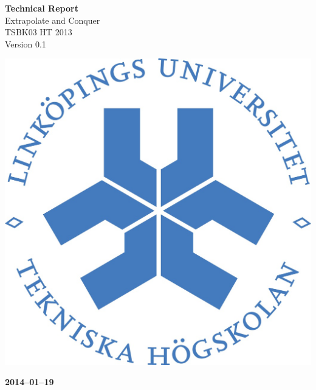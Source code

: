 \documentclass[pdftex, fontsize=11pt, a4paper]{scrbook}
\begin{document}
\begin{titlepage}
\thispagestyle{empty}
\begin{center}
	\vspace*{4\baselineskip}

	\textbf{\huge Technical Report} \\
	\vspace*{0.5\baselineskip}
	{\large  Extrapolate and Conquer} \\
	\vspace*{0.5\baselineskip}
	{\large  TSBK03 HT 2013} \\
	\vspace*{0.5\baselineskip}
	{\large  Version 0.1}


	\vspace*{6\baselineskip}
	\includegraphics[width=0.4\linewidth]{lith_sigill_col}

	\vfill

	\textbf{2014--01--19} \\
	[2\baselineskip]
\end{center}

\end{titlepage}
\end{document}
